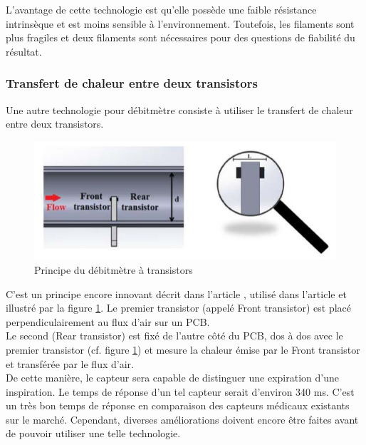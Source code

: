 L'avantage de cette technologie est qu'elle possède une faible résistance intrinsèque et est moins sensible à l'environnement. Toutefois, les 
filaments sont plus fragiles et deux filaments sont nécessaires pour des questions de fiabilité du résultat. 

\subsubsection{Transfert de chaleur entre deux transistors}

Une autre technologie pour débitmètre consiste à utiliser le transfert de chaleur entre deux transistors. 
\begin{figure}[H]
    \centering
    \includegraphics[scale = 0.5]{images/Debitmetre_transistors.png}
    \caption{Principe du débitmètre à transistors\cite{giorgino_design_2014}}
    \label{fig:transistors}
\end{figure}

C'est un principe encore innovant décrit dans l'article \cite{giorgino_design_2014}, utilisé dans l'article \cite{rosi_device_2016} et illustré 
par la figure \ref{fig:transistors}. 
Le premier transistor (appelé Front transistor) est placé perpendiculairement au flux d'air sur un PCB. \\
Le second (Rear transistor) est fixé de l'autre côté du PCB, dos à dos avec le premier transistor (cf. figure \ref{fig:transistors}) et mesure la 
chaleur émise par le Front transistor et transférée par le flux d'air. \\
De cette manière, le capteur sera capable de distinguer une expiration d'une inspiration. Le temps de réponse d'un tel capteur serait 
d'environ 340 ms. C'est un très bon temps de réponse en comparaison des capteurs médicaux existants sur le marché. Cependant, diverses améliorations 
doivent encore être faites avant de pouvoir utiliser une telle technologie. 

